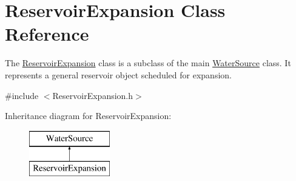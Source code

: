 \hypertarget{classReservoirExpansion}{}\section{Reservoir\+Expansion Class Reference}
\label{classReservoirExpansion}


The {\ttfamily \mbox{\hyperlink{classReservoirExpansion}{Reservoir\+Expansion}}} class is a subclass of the main {\ttfamily \mbox{\hyperlink{classWaterSource}{Water\+Source}}} class. It represents a general reservoir object scheduled for expansion.  




{\ttfamily \#include $<$Reservoir\+Expansion.\+h$>$}

Inheritance diagram for Reservoir\+Expansion\+:\begin{figure}[H]
\begin{center}
\leavevmode
\includegraphics[height=2.000000cm]{classReservoirExpansion}
\end{center}
\end{figure}
